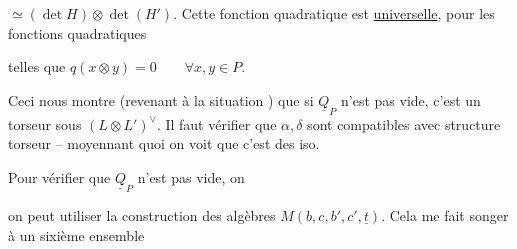 
$\simeq(\det H)\otimes\det(H')$. Cette  fonction
quadratique est \uline{universelle}, pour
les fonctions quadratiques


telles que $q(x\otimes y)=0\qquad\forall x,y\in P$.

Ceci nous montre  (revenant
à  la situation ) que
si $\underline Q_P$ n'est pas vide, c'est un torseur
sous  $(L\otimes L')^\vee$. Il faut vérifier
que $\alpha,\delta$ sont compatibles avec
structure torseur -- moyennant quoi
on voit que c'est des iso.

Pour vérifier que $\underline Q_P$ n'est pas
vide, on 

on peut utiliser la construction
des algèbres $M(b,c,b',c',\underline t)$. Cela
me fait songer à un sixième
ensemble

